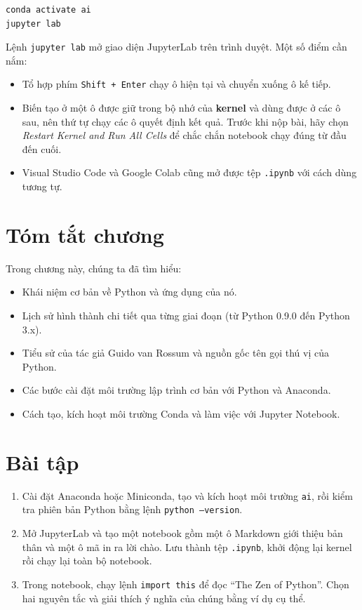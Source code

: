 \begin{lstlisting}[language=bash, caption={Mở JupyterLab trong môi trường ai}]
conda activate ai
jupyter lab
\end{lstlisting}

Lệnh \texttt{jupyter lab} mở giao diện JupyterLab trên trình duyệt. Một số điểm cần nắm:
\begin{itemize}
    \item Tổ hợp phím \texttt{Shift + Enter} chạy ô hiện tại và chuyển xuống ô kế tiếp.
    \item Biến tạo ở một ô được giữ trong bộ nhớ của \textbf{kernel} và dùng được ở các ô sau, nên thứ tự chạy các ô quyết định kết quả. Trước khi nộp bài, hãy chọn \textit{Restart Kernel and Run All Cells} để chắc chắn notebook chạy đúng từ đầu đến cuối.
    \item Visual Studio Code và Google Colab cũng mở được tệp \texttt{.ipynb} với cách dùng tương tự.
\end{itemize}

\section{Tóm tắt chương}

Trong chương này, chúng ta đã tìm hiểu:
\begin{itemize}
    \item Khái niệm cơ bản về Python và ứng dụng của nó.
    \item Lịch sử hình thành chi tiết qua từng giai đoạn (từ Python 0.9.0 đến Python 3.x).
    \item Tiểu sử của tác giả Guido van Rossum và nguồn gốc tên gọi thú vị của Python.
    \item Các bước cài đặt môi trường lập trình cơ bản với Python và Anaconda.
    \item Cách tạo, kích hoạt môi trường Conda và làm việc với Jupyter Notebook.
\end{itemize}

\section{Bài tập}
\begin{enumerate}
    \item Cài đặt Anaconda hoặc Miniconda, tạo và kích hoạt môi trường \texttt{ai}, rồi kiểm tra phiên bản Python bằng lệnh \texttt{python --version}.
    \item Mở JupyterLab và tạo một notebook gồm một ô Markdown giới thiệu bản thân và một ô mã in ra lời chào. Lưu thành tệp \texttt{.ipynb}, khởi động lại kernel rồi chạy lại toàn bộ notebook.
    \item Trong notebook, chạy lệnh \texttt{import this} để đọc ``The Zen of Python''. Chọn hai nguyên tắc và giải thích ý nghĩa của chúng bằng ví dụ cụ thể.
\end{enumerate}

